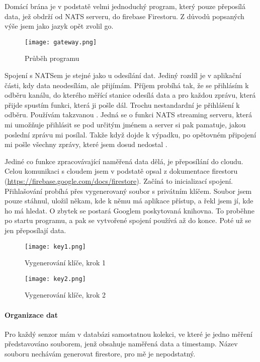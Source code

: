 Domácí brána je v podstatě velmi jednoduchý program, který pouze přeposílá data, jež obdrží od NATS serveru, do 
\gls{firebase} Firestoru. Z důvodů popsaných výše jsem jako jazyk opět zvolil \gls{go}.

\begin{figure}[H]
    \centering
    \texttt{[image: gateway.png]}
    \caption{Průběh programu}
\end{figure}

Spojení s NATSem je stejné jako u odesílání dat. Jediný rozdíl je v aplikační části, kdy data neodesílám, ale přijímám. 
Příjem probíhá tak, že se přihlásím k odběru kanálu, do kterého měřící stanice odesílá data a pro každou zprávu, která 
přijde spustím funkci, která ji pošle dál. Trochu nestandardní je přihlášení k odběru. Používám takzvanou . Jedná se o funkci NATS streaming serveru, která mi umožňuje přihlásit se pod určitým jménem a server si 
pak pamatuje, jakou poslední zprávu mi posílal. Takže když dojde k výpadku, po opětovném připojení mi pošle všechny 
zprávy, které jsem dosud nedostal \parencite{root.cz:NATS-streaming}.

Jediné co funkce zpracovávající naměřená data dělá, je přeposílání do cloudu. Celou komunikaci s cloudem jsem v podstatě 
opsal z dokumentace firestoru (\url{https://firebase.google.com/docs/firestore}). Začíná to inicializací spojení. 
Přihlašování probíhá přes vygenerovaný soubor s privátním klíčem. Soubor jsem pouze stáhnul, uložil někam, kde k němu má 
aplikace přístup, a řekl jsem jí, kde ho má hledat. O zbytek se postará Googlem poskytovaná \gls{knihovna}. To proběhne 
po startu programu, a pak se vytvořené spojení používá až do konce. Poté už se jen přeposílají data.

\begin{figure}[H]
    \centering
    \texttt{[image: key1.png]}
    \caption{Vygenerování klíče, krok 1}
\end{figure}
\begin{figure}[H]
    \centering
    \texttt{[image: key2.png]}
    \caption{Vygenerování klíče, krok 2}
\end{figure}

\paragraph*{Organizace dat}
Pro každý senzor mám v databázi samostatnou kolekci, ve které je jedno měření představováno souborem, jenž obsahuje 
naměřená data a \gls{timestamp}. Název souboru nechávám generovat firestore, pro mě je nepodstatný.
